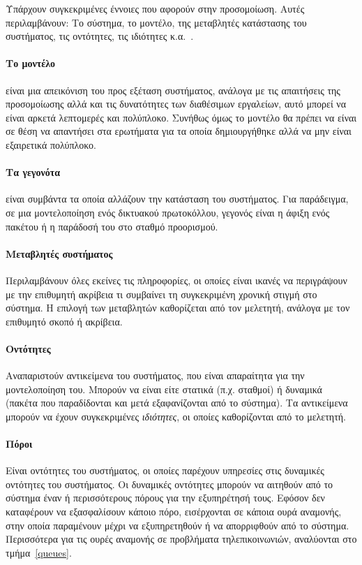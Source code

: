 \documentclass[12pt]{report}
\begin{document}
Υπάρχουν συγκεκριμένες έννοιες που αφορούν στην προσομοίωση. Αυτές περιλαμβάνουν: Το σύστημα, το μοντέλο, της μεταβλητές κατάστασης του συστήματος, τις οντότητες, τις ιδιότητες κ.α.~\cite{book:04}.

\paragraph{Το μοντέλο} είναι μια απεικόνιση του προς εξέταση συστήματος, ανάλογα με τις απαιτήσεις της προσομοίωσης αλλά και τις δυνατότητες των διαθέσιμων εργαλείων, αυτό μπορεί να είναι αρκετά λεπτομερές και πολύπλοκο. Συνήθως όμως το μοντέλο θα πρέπει να είναι σε θέση να απαντήσει στα ερωτήματα για τα οποία δημιουργήθηκε αλλά να μην είναι εξαιρετικά πολύπλοκο.

\paragraph{Τα γεγονότα} είναι συμβάντα τα οποία αλλάζουν την κατάσταση του συστήματος. Για παράδειγμα, σε μια μοντελοποίηση ενός δικτυακού πρωτοκόλλου, γεγονός είναι η άφιξη ενός πακέτου ή η παράδοσή του στο σταθμό προορισμού.

\paragraph{Μεταβλητές συστήματος} Περιλαμβάνουν όλες εκείνες τις πληροφορίες, οι οποίες είναι ικανές να περιγράψουν με την επιθυμητή ακρίβεια τι συμβαίνει τη συγκεκριμένη χρονική στιγμή στο σύστημα. Η επιλογή των μεταβλητών καθορίζεται από τον μελετητή, ανάλογα με τον επιθυμητό σκοπό ή ακρίβεια.

\paragraph{Οντότητες} Αναπαριστούν αντικείμενα του συστήματος, που είναι απαραίτητα για την μοντελοποίηση του. Μπορούν να είναι είτε στατικά (π.χ. σταθμοί) ή δυναμικά (πακέτα που παραδίδονται και μετά εξαφανίζονται από το σύστημα). Τα αντικείμενα μπορούν να έχουν συγκεκριμένες \textit{ιδιότητες}, οι οποίες καθορίζονται από το μελετητή.

\paragraph{Πόροι} Είναι οντότητες του συστήματος, οι οποίες παρέχουν υπηρεσίες στις δυναμικές οντότητες του συστήματος. Οι δυναμικές οντότητες μπορούν να αιτηθούν από το σύστημα έναν ή περισσότερους πόρους για την εξυπηρέτησή τους. Εφόσον δεν καταφέρουν να εξασφαλίσουν κάποιο πόρο, εισέρχονται σε κάποια ουρά αναμονής, στην οποία παραμένουν μέχρι να εξυπηρετηθούν ή να απορριφθούν από το σύστημα. Περισσότερα για τις ουρές αναμονής σε προβλήματα τηλεπικοινωνιών, αναλύονται στο τμήμα~\ref{queues}.
\end{document}
